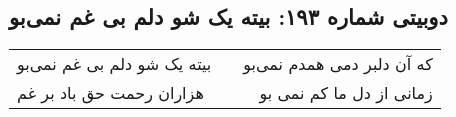 \begin{center}
\section*{دوبیتی شماره ۱۹۳: بیته یک شو دلم بی غم نمی‌بو}
\label{sec:193}
\begin{longtable}{l p{0.5cm} r}
بیته یک شو دلم بی غم نمی‌بو
&&
که آن دلبر دمی همدم نمی‌بو
\\
هزاران رحمت حق باد بر غم
&&
زمانی از دل ما کم نمی بو
\\
\end{longtable}
\end{center}
